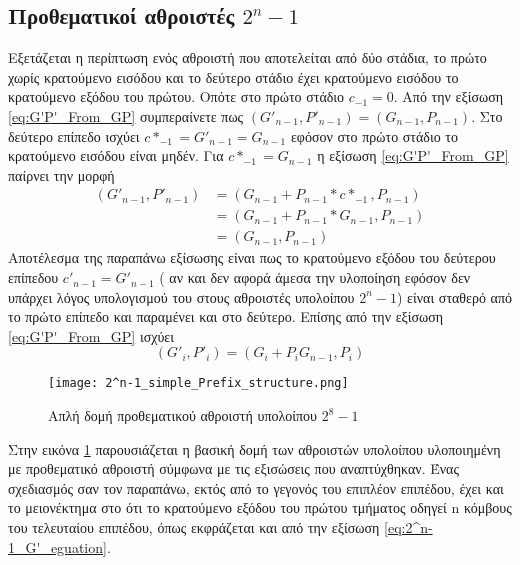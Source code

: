 \subsection{Προθεματικοί αθροιστές $2^n-1$ }
Εξετάζεται η περίπτωση ενός αθροιστή που αποτελείται από δύο στάδια, το πρώτο χωρίς κρατούμενο εισόδου
και το δεύτερο στάδιο έχει κρατούμενο εισόδου το κρατούμενο εξόδου του πρώτου. Οπότε στο
πρώτο στάδιο $c_{-1} = 0$. Από την εξίσωση \ref{eq:G'P'_From_GP} συμπεραίνετε πως 
$(G'_{n-1},P'_{n-1}) = (G_{n-1},P_{n-1})$. Στο δεύτερο επίπεδο ισχύει 
$c*_{-1} = G'_{n-1} = G_{n-1} $ εφόσον στο πρώτο στάδιο το κρατούμενο εισόδου είναι μηδέν.
Για $c*_{-1} = G_{n-1}$ η εξίσωση \ref{eq:G'P'_From_GP} παίρνει την μορφή 
\begin{equation*}
\begin{split}
    (G'_{n-1},P'_{n-1}) &= ( G_{n-1} + P_{n-1}*c*_{-1} ,  P_{n-1} )\\
    &=( G_{n-1} + P_{n-1}*G_{n-1} ,  P_{n-1} )\\
    &=(G_{n-1},P_{n-1})
\end{split}    
\end{equation*}
Αποτέλεσμα της παραπάνω εξίσωσης είναι πως το κρατούμενο εξόδου του δεύτερου επίπεδου 
$c'_{n-1} = G'_{n-1}$
( αν και δεν αφορά άμεσα την υλοποίηση εφόσον δεν υπάρχει λόγος υπολογισμού του 
στους αθροιστές υπολοίπου $2^n-1$) είναι σταθερό από το πρώτο επίπεδο και παραμένει και στο 
δεύτερο. Επίσης από την εξίσωση \ref{eq:G'P'_From_GP} ισχύει 
\begin{equation}
\label{eq:2^n-1_G'_eguation}
    (G'_i,P'_i) = (G_i + P_iG_{n-1} , P_{i})
\end{equation}

\begin{figure}[H]
    \centering
    \texttt{[image: 2^n-1\_simple\_Prefix\_structure.png]}
    \caption{Απλή δομή προθεματικού αθροιστή υπολοίπου $2^8-1$}
    \label{fig:2^n-1_simple_Prefix_structure}
\end{figure}
Στην εικόνα \ref{fig:2^n-1_simple_Prefix_structure} παρουσιάζεται η βασική δομή των αθροιστών υπολοίπου υλοποιημένη με προθεματικό αθροιστή σύμφωνα με τις εξισώσεις που αναπτύχθηκαν.
Ένας σχεδιασμός σαν τον παραπάνω, εκτός από το γεγονός του επιπλέον επιπέδου,
έχει και το μειονέκτημα στο ότι το κρατούμενο εξόδου του πρώτου τμήματος οδηγεί 
n κόμβους του τελευταίου επιπέδου, όπως εκφράζεται και από την εξίσωση \ref{eq:2^n-1_G'_eguation}.


















